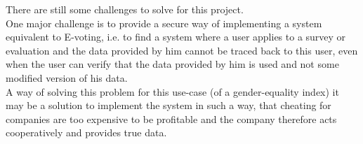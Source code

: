 There are still some challenges to solve for this project.\\[5pt]
One major challenge is to provide a secure way of implementing a system equivalent to E-voting, i.e. to find a system where a user applies to a survey or evaluation and the data provided by him cannot be traced back to this user, even when the user can verify that the data provided by him is used and not some modified version of his data.\\
A way of solving this problem for this use-case (of a gender-equality index) it may be a solution to implement the system in such a way, that cheating for companies are too expensive to be profitable and the company therefore acts cooperatively and provides true data.

	
